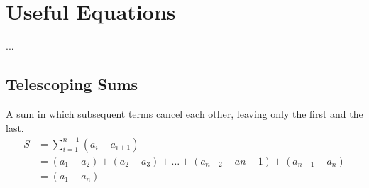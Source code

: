 
\thispagestyle{fancyplain}

\chapter{Useful Equations}
...

\section{Telescoping Sums}
\label{appendix:equations|eqn:telescoping}
A sum in which subsequent terms cancel each other, leaving only the first and
the last.
\begin{align}
	S &= \sum_{i=1}^{n-1}(a_{i} - a_{i+1}) \\
	&= (a_1-a_2)+(a_2-a_3) + \dots + (a_{n-2}-a{n-1}) + (a_{n-1}-a_n)
	\nonumber \\
	&= (a_1 - a_n) \nonumber
\end{align}


